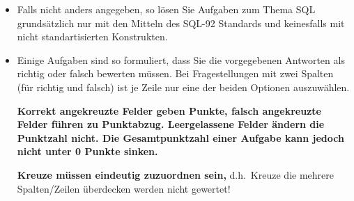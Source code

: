 \begin{description}
\begin{itemize}
    \item Falls nicht anders angegeben, so lösen Sie Aufgaben zum Thema SQL grundsätzlich nur mit den Mitteln des SQL-92 Standards und keinesfalls mit nicht standartisierten Konstrukten.

    \item Einige Aufgaben sind so formuliert, dass Sie die vorgegebenen Antworten
    als richtig oder falsch bewerten müssen. Bei Fragestellungen mit zwei Spalten (für richtig und falsch)
    ist je Zeile nur eine der beiden Optionen auszuwählen.

    \textbf{Korrekt angekreuzte Felder geben Punkte, falsch angekreuzte Felder führen zu Punktabzug.
    Leergelassene Felder ändern die Punktzahl nicht. Die Gesamtpunktzahl einer Aufgabe kann jedoch nicht
    unter 0 Punkte sinken.}

    \textbf{Kreuze müssen eindeutig zuzuordnen sein,} d.h.\ Kreuze die mehrere Spalten/Zeilen überdecken
    werden nicht gewertet!


  \end{itemize}
\end{description}
\newpage
